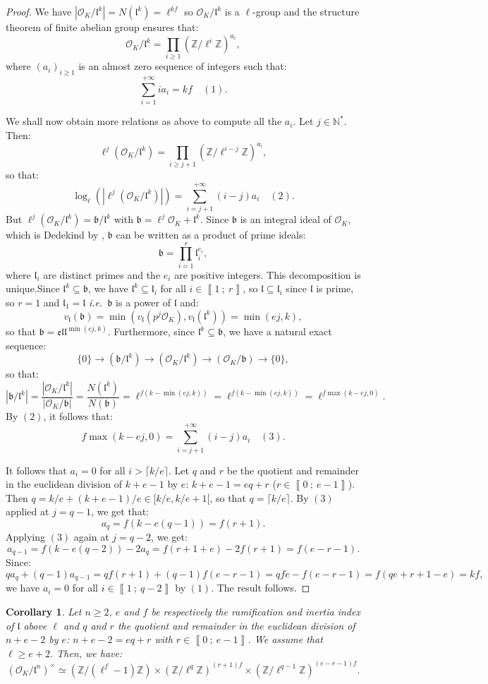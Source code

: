 \documentclass[a4paper,10pt,notitlepage]{report}
\theoremstyle{definition}
\theoremstyle{plain}
\newtheorem{Corollary}[Definition]{Corollary}
\theoremstyle{definition}
\newcommand{\ie}{\emph{i.e.}\ }
\newcommand{\N}{\mathbb{N}}
\newcommand{\Z}{\mathbb{Z}}
\newcommand{\mO}{\mathcal{O}}
\renewcommand{\i}[2]{\left\llbracket #1~;~#2\right\rrbracket}
\renewcommand{\(}{\left(}
\renewcommand{\)}{\right)}
\newcommand{\mf}[1]{\mathfrak{#1}}
\begin{document}
\begin{proof}
We have $|\mO_K/\mf{l}^k|=N(\mf{l}^k)=\ell^{kf}$ so $\mO_K/\mf{l}^k$ is a $\ell$-group and the structure theorem of finite abelian group ensures that:
\[\mO_K/\mf{l}^k=\prod_{i\geq 1}(\Z/\ell^i\Z)^{a_i},\]
where $(a_i)_{i\geq 1}$ is an almost zero sequence of integers such that:
\[\sum_{i=1}^{+\infty} ia_i=kf\quad (1).\]

We shall now obtain more relations as above to compute all the $a_i$. Let $j\in\N^*$. Then:
\[\ell^j(\mO_K/\mf{l}^k)=\prod_{i\geq j+1}(\Z/\ell^{i-j}\Z)^{a_i},\]
so that:
\[\log_{\ell}(|\ell^j(\mO_K/\mf{l}^k)|)=\sum_{i=j+1}^{+\infty} (i-j)a_i\quad (2).\]
But $\ell^j(\mO_K/\mf{l}^k)=\mf{b}/\mf{l}^k$ with $\mf{b}=\ell^j\mO_K+\mf{l}^k$. Since $\mf{b}$ is an integral ideal of $\mO_K$, which is Dedekind by \cite[Corollary 5.6]{Cox}, $\mf{b}$ can be written as a product of prime ideals:
\[\mf{b}=\prod_{i=1}^r\mf{l}_i^{e_i},\]
where $\mf{l}_i$ are distinct primes and the $e_i$ are positive integers. This decomposition is unique.Since $\mf{l}^k\subseteq \mf{b}$, we have $\mf{l}^k\subseteq\mf{l}_i$ for all $i\in\i{1}{r}$, so  $\mf{l}\subseteq\mf{l}_i$ since $\mf{l}$ is prime, so $r=1$ and $\mf{l}_1=\mf{l}$ \ie $\mf{b}$ is a power of $\mf{l}$ and:
\[v_{\mf{l}}(\mf{b})=\min(v_{\mf{l}}(p^j\mO_K),v_{\mf{l}}(\mf{l}^k))=\min(ej,k),\]
so that $\mf{b}=\mf{ell}^{\min(ej,k)}$. Furthermore, since $\mf{l}^k\subseteq \mf{b}$, we have a natural exact sequence:
\[\{0\}\longrightarrow(\mf{b}/\mf{l}^k)\longrightarrow (\mO_K/\mf{l}^k)\longrightarrow (\mO_K/\mf{b}) \longrightarrow \{0\},\]
so that:
\[|\mf{b}/\mf{l}^k|=\frac{|\mO_K/\mf{l}^k|}{|\mO_K/\mf{b}|}=\frac{N(\mf{l}^k)}{N(\mf{b})}=\ell^{f(k-\min(ej,k))}=\ell^{f(k-\min(ej,k))}=\ell^{f\max(k-ej,0)}.\]
By $(2)$, it follows that:
\[f\max(k-ej,0)=\sum_{i=j+1}^{+\infty} (i-j)a_i \quad (3).\]

It follows that $a_i=0$ for all $i>\lceil k/e\rceil$. Let $q$ and $r$ be the quotient and remainder in the euclidean division of $k+e-1$ by $e$: $k+e-1=eq+r$ ($r\in\i{0}{e-1}$). Then $q=k/e+(k+e-1)/e\in[k/e,k/e+1[$, so that $q=\lceil k/e\rceil$.  By $(3)$ applied at $j=q-1$, we get that:
\[a_q=f(k-e(q-1))=f(r+1).\]
Applying $(3)$ again at $j=q-2$, we get:
\[a_{q-1}=f(k-e(q-2))-2a_q=f(r+1+e)-2f(r+1)=f(e-r-1).\]
Since:
\[qa_q+(q-1)a_{q-1}=qf(r+1)+(q-1)f(e-r-1)=qfe-f(e-r-1)=f(qe+r+1-e)=kf,\]
we have $a_i=0$ for all $i\in\i{1}{q-2}$ by $(1)$. The result follows.
\end{proof}

\begin{Corollary}
Let $n\geq 2$, $e$ and $f$ be respectively the ramification and inertia index of $\mf{l}$ above $\ell$ and $q$ and $r$ the quotient and remainder in the euclidean division of $n+e-2$ by $e$: $n+e-2=eq+r$ with $r\in\i{0}{e-1}$. We assume that $\ell\geq e+2$. Then, we have:
\[(\mO_K/\mf{l}^n)^\times\simeq (\Z/(\ell^f-1)\Z)\times (\Z/\ell^q\Z)^{(r+1)f}\times(\Z/\ell^{q-1}\Z)^{(e-r-1)f}.\]
\end{Corollary}
\end{document}
